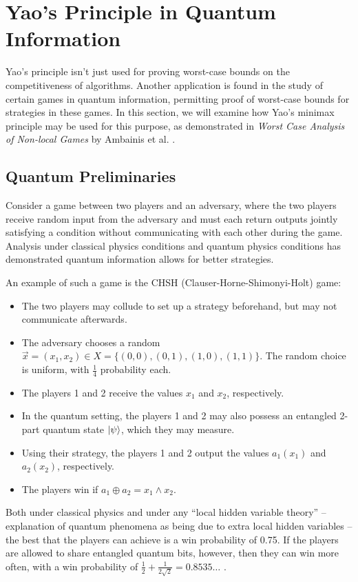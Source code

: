 \section{Yao's Principle in Quantum Information}

Yao's principle isn't just used for proving worst-case bounds on the competitiveness of algorithms. Another application is found in the study of certain games in quantum information, permitting proof of worst-case bounds for strategies in these games. In this section, we will examine how Yao's minimax principle may be used for this purpose, as demonstrated in \emph{Worst Case Analysis of Non-local Games} by Ambainis et al. \cite{ABBSSV}.

\subsection{Quantum Preliminaries}

Consider a game between two players and an adversary, where the two players receive random input from the adversary and must each return outputs jointly satisfying a condition without communicating with each other during the game. Analysis under classical physics conditions and quantum physics conditions has demonstrated quantum information allows for better strategies.

An example of such a game is the CHSH (Clauser-Horne-Shimonyi-Holt) \cite{CHSH} game:

\begin{itemize}
\item{The two players may collude to set up a strategy beforehand, but may not communicate afterwards.}
\item{The adversary chooses a random $\vec{x}=(x_1, x_2) \in X=\{(0,0), (0,1), (1,0), (1,1)\}$. The random choice is uniform, with $\frac14$ probability each.}
\item{The players 1 and 2 receive the values $x_1$ and $x_2$, respectively.}
\item{In the quantum setting, the players 1 and 2 may also possess an entangled 2-part quantum state $\ket{\psi}$, which they may measure.}
\item{Using their strategy, the players 1 and 2 output the values $a_1(x_1)$ and $a_2(x_2)$, respectively.}
\item{The players win if $a_1 \oplus a_2 = x_1 \wedge x_2$.}
\end{itemize}

Both under classical physics and under any ``local hidden variable theory'' -- explanation of quantum phenomena as being due to extra local hidden variables -- the best that the players can achieve is a win probability of 0.75. If the players are allowed to share entangled quantum bits, however, then they can win more often, with a win probability of $\frac12 + \frac1{2\sqrt2} = 0.8535\ldots$ \cite{ABBSSV,CHSH}.

